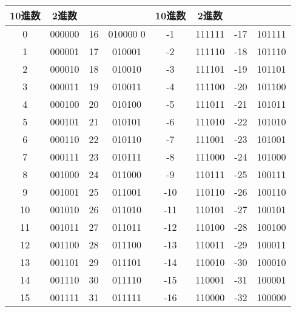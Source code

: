 \documentclass[lualatex,js=standard,hiresbb,openany]{bxjsarticle}
\begin{document}
\begin{table}[H]
\begin{center}
\begin{tabular}{lcccc}
     
     \hline                          
   \end{tabular}
   \label{tab:}
  \end{center}
 \end{table}
 \newpage

 \begin{table}[H]
  \begin{center}
   \begin{tabular}{|c|c|c|c|c|c|c|c|}\hline
      10進数 & 2進数 & & & 10進数 & 2進数 & & \\
      \hline
      0      & 000000 &  16 & 010000 0  &   -1      & 111111 &  -17 & 101111 \\
      1      & 000001 &  17 & 010001    &   -2      & 111110 &  -18 & 101110 \\     
      2      & 000010 &  18 & 010010    &   -3      & 111101 &  -19 & 101101 \\   
      3      & 000011 &  19 & 010011    &   -4      & 111100 &  -20 & 101100 \\   
      4      & 000100 &  20 & 010100    &   -5      & 111011 &  -21 & 101011 \\   
      5      & 000101 &  21 & 010101    &   -6      & 111010 &  -22 & 101010 \\   
      6      & 000110 &  22 & 010110    &   -7      & 111001 &  -23 & 101001 \\   
      7      & 000111 &  23 & 010111    &   -8      & 111000 &  -24 & 101000 \\   
      8      & 001000 &  24 & 011000    &   -9      & 110111 &  -25 & 100111 \\   
      9      & 001001 &  25 & 011001    &  -10      & 110110 &  -26 & 100110 \\   
     10      & 001010 &  26 & 011010    &  -11      & 110101 &  -27 & 100101 \\   
     11      & 001011 &  27 & 011011    &  -12      & 110100 &  -28 & 100100 \\   
     12      & 001100 &  28 & 011100    &  -13      & 110011 &  -29 & 100011 \\   
     13      & 001101 &  29 & 011101    &  -14      & 110010 &  -30 & 100010 \\   
     14      & 001110 &  30 & 011110    &  -15      & 110001 &  -31 & 100001 \\   
     15      & 001111 &  31 & 011111    &  -16      & 110000 &  -32 & 100000 \\   
     \hline
   \end{tabular}
   \label{tab:}
  \end{center}
 \end{table}

 
\end{document}
